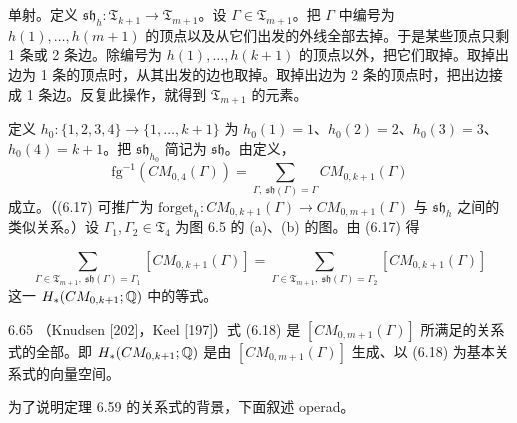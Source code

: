 单射。定义 $\mathfrak{sh}_h:\mathfrak{T}_{k+1}\to\mathfrak{T}_{m+1}$。设 $\Gamma\in\mathfrak{T}_{m+1}$。把 $\Gamma$ 中编号为 $h(1),\dots,h(m+1)$ 的顶点以及从它们出发的外线全部去掉。于是某些顶点只剩 1 条或 2 条边。除编号为 $h(1),\dots,h(k+1)$ 的顶点以外，把它们取掉。取掉出边为 1 条的顶点时，从其出发的边也取掉。取掉出边为 2 条的顶点时，把出边接成 1 条边。反复此操作，就得到 $\mathfrak{T}_{m+1}$ 的元素。

定义 $h_0:\{1,2,3,4\}\to\{1,\dots,k+1\}$ 为 $h_0(1)=1$、$h_0(2)=2$、$h_0(3)=3$、$h_0(4)=k+1$。把 $\mathfrak{sh}_{h_0}$ 简记为 $\mathfrak{sh}$。由定义，
\begin{equation}
  \mathrm{fg}^{-1}(CM_{0,4}(\Gamma))=\sum_{\Gamma,\ \mathfrak{sh}(\Gamma)=\Gamma}CM_{0,k+1}(\Gamma) \tag{6.17}
\end{equation}
成立。（(6.17) 可推广为 $\mathrm{forget}_h:CM_{0,k+1}(\Gamma)\to CM_{0,m+1}(\Gamma)$ 与 $\mathfrak{sh}_h$ 之间的类似关系。）设 $\Gamma_1,\Gamma_2\in\mathfrak{T}_4$ 为图 6.5 的 (a)、(b) 的图。由 (6.17) 得

\begin{equation}
  \sum_{\Gamma\in\mathfrak{T}_{m+1},\ \mathfrak{sh}(\Gamma)=\Gamma_1}[CM_{0,k+1}(\Gamma)]=\sum_{\Gamma\in\mathfrak{T}_{m+1},\ \mathfrak{sh}(\Gamma)=\Gamma_2}[CM_{0,k+1}(\Gamma)] \tag{6.18}
\end{equation}
这一 $H_*(CM_{0,k+1};\mathbb{Q})$ 中的等式。

\begin{theorem}{6.65}
  （Knudsen [202]，Keel [197]）式 (6.18) 是 $[CM_{0,m+1}(\Gamma)]$ 所满足的关系式的全部。即 $H_*(CM_{0,k+1};\mathbb{Q})$ 是由 $[CM_{0,m+1}(\Gamma)]$ 生成、以 (6.18) 为基本关系式的向量空间。
\end{theorem}

为了说明定理 6.59 的关系式的背景，下面叙述 operad。

